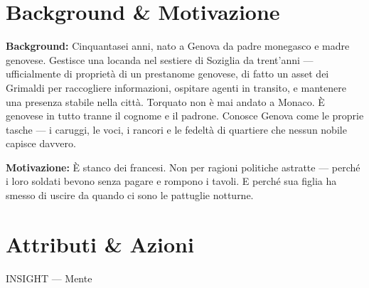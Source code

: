 \clearpage


\section*{Background \& Motivazione}

\begin{rulebox}{}
  \textbf{Background:} Cinquantasei anni, nato a Genova da padre monegasco e madre
  genovese. Gestisce una locanda nel sestiere di Soziglia da trent'anni —
  ufficialmente di proprietà di un prestanome genovese, di fatto un asset
  dei Grimaldi per raccogliere informazioni, ospitare agenti in transito,
  e mantenere una presenza stabile nella città. Torquato non è mai andato
  a Monaco. È genovese in tutto tranne il cognome e il padrone.
  Conosce Genova come le proprie tasche — i caruggi, le voci, i rancori
  e le fedeltà di quartiere che nessun nobile capisce davvero.

  \medskip\noindent\textcolor{GrimaldiPurple}{\textbf{Motivazione:}} È stanco
  dei francesi. Non per ragioni politiche astratte — perché i loro soldati
  bevono senza pagare e rompono i tavoli. E perché sua figlia ha smesso
  di uscire da quando ci sono le pattuglie notturne.
\end{rulebox}

\section*{Attributi \& Azioni}


\begin{attributoblock}[GrimaldiPurple]{INSIGHT — Mente}
\end{attributoblock}


